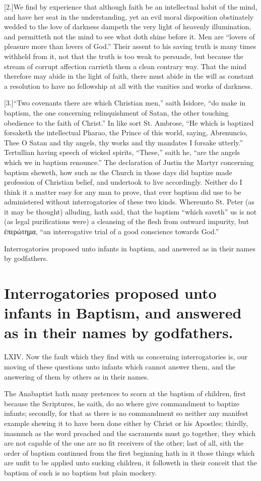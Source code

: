 [2.]We find by experience that although faith be an intellectual habit of the mind, and have her seat in the understanding, yet an evil moral disposition obstinately wedded to the love of darkness dampeth the very light of heavenly illumination, and permitteth not the mind to see what doth shine before it. Men are “lovers of pleasure more than lovers of God.” Their assent to his saving truth is many times withheld from it, not that the truth is too weak to persuade, but because the stream of corrupt affection carrieth them a clean contrary way. That the mind therefore may abide in the light of faith, there must abide in the will as constant a resolution to have no fellowship at all with the vanities and works of darkness.

[3.]“Two covenants there are which Christian men,” saith Isidore, “do make in baptism, the one concerning relinquishment of Satan, the other touching obedience to the faith of Christ.” In like sort St. Ambrose, “He which is baptized forsaketh the intellectual Pharao, the Prince of this world, saying, Abrenuncio, Thee O Satan and thy angels, thy works and thy mandates I forsake utterly.” Tertullian having speech of wicked spirits, “These,” saith he, “are the angels which we in baptism renounce.” The declaration of Justin the Martyr concerning baptism sheweth,  how such as the Church in those days did baptize made profession of Christian belief, and undertook to live accordingly.
 Neither do I think it a matter easy for any man to prove, that ever baptism did use to be administered without interrogatories of these two kinds. Whereunto St. Peter (as it may be thought) alluding, hath said, that the baptism “which saveth” us is not (as legal purifications were) a cleansing of the flesh from outward impurity, but ἐπερώτημα, “an interrogative trial of a good conscience towards God.”


Interrogatories proposed unto infants in baptism, and answered as in their names by godfathers.
\section*{Interrogatories proposed unto infants in Baptism, and answered as in their names by godfathers.}
LXIV. Now the fault which they find with us concerning interrogatories is, our moving of these questions unto infants which cannot answer them, and the answering of them by others as in their names.

The Anabaptist hath many pretences to scorn at the baptism of children, first because the Scriptures, he saith, do no where give commandment to baptize infants; secondly, for that as there is no commandment so neither any manifest example shewing it to have been done either by Christ or his Apostles; thirdly, inasmuch as the word preached and the sacraments must go together, they which are not capable of the one are no fit receivers of the other; last of all, sith the order of baptism continued from the first beginning hath in it those things which are unfit to be applied unto sucking children, it followeth in their conceit that the baptism of such is no baptism but plain mockery.

